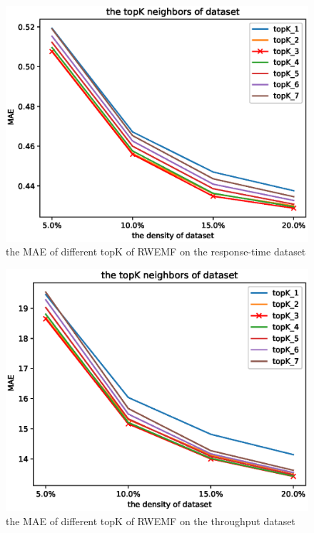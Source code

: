 \documentclass[conference]{IEEEtran}
\begin{document}
\begin{figure}[H]  
\centering  
\includegraphics[width=0.45\paperwidth]{topk_rt.eps}  
\caption{the MAE of different topK of RWEMF on the response-time dataset }  
\label{fig_rt}  
\end{figure} 

\begin{figure}[H] 
\centering  
\includegraphics[width=0.45\paperwidth]{topk_tp.eps}  
\caption{the MAE of different topK of RWEMF on the throughput dataset }
\label{fig_tp}  
\end{figure} 
\end{document}

